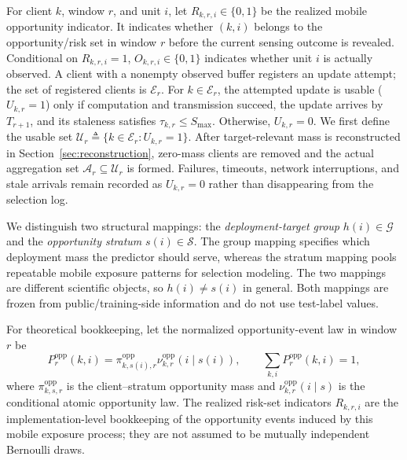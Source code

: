 \documentclass[letterpaper,journal]{IEEEtran}
\begin{document}
For client $k$, window $r$, and unit $i$, let
$R_{k,r,i}\in\{0,1\}$ be the realized mobile opportunity indicator.
It indicates whether $(k,i)$ belongs to the opportunity/risk set in
window $r$ before the current sensing outcome is revealed.
Conditional on $R_{k,r,i}=1$,
$O_{k,r,i}\in\{0,1\}$
indicates whether unit $i$ is actually observed.  A client with a
nonempty observed buffer registers an update attempt; the set of
registered clients is $\mathcal{E}_r$.  For $k\in\mathcal{E}_r$, the
attempted update is usable ($U_{k,r}=1$) only if computation and
transmission succeed, the update arrives by $T_{r+1}$, and its
staleness satisfies $\tau_{k,r}\le S_{\max}$.  Otherwise,
$U_{k,r}=0$.  We first define the usable set
$\mathcal{U}_r\triangleq\{k\in\mathcal{E}_r:U_{k,r}=1\}$.
After target-relevant mass is reconstructed in
Section~\ref{sec:reconstruction}, zero-mass clients are removed and the
actual aggregation set $\mathcal{A}_r\subseteq\mathcal{U}_r$ is formed.
Failures, timeouts, network interruptions, and stale arrivals remain
recorded as $U_{k,r}=0$ rather than disappearing from the selection
log.

We distinguish two structural mappings: the \emph{deployment-target
group} $h(i)\in\mathcal{G}$ and the \emph{opportunity stratum}
$s(i)\in\mathcal{S}$.  The group mapping specifies which deployment
mass the predictor should serve, whereas the stratum mapping pools
repeatable mobile exposure patterns for selection modeling.  The two
mappings are different scientific objects, so $h(i)\neq s(i)$ in
general.  Both mappings are frozen from public/training-side
information and do not use test-label values.

For theoretical bookkeeping, let the normalized opportunity-event law in
window $r$ be
\begin{equation}
 P_r^{\mathrm{opp}}(k,i)
 =
 \pi^{\mathrm{opp}}_{k,s(i),r}
 \nu^{\mathrm{opp}}_{k,r}(i\mid s(i)),
 \qquad
 \sum_{k,i}P_r^{\mathrm{opp}}(k,i)=1,
 \label{eq:opp_event_law}
\end{equation}
where $\pi^{\mathrm{opp}}_{k,s,r}$ is the client--stratum opportunity mass and
$\nu^{\mathrm{opp}}_{k,r}(i\mid s)$ is the conditional atomic opportunity law.
The realized risk-set indicators $R_{k,r,i}$ are the implementation-level
bookkeeping of the opportunity events induced by this mobile exposure process;
they are not assumed to be mutually independent Bernoulli draws.
\end{document}
